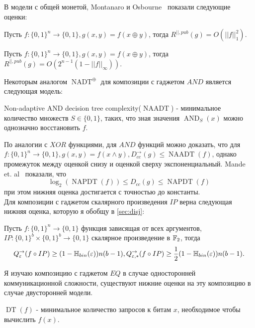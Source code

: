 \documentclass{article}
\begin{document}
В модели с общей монетой, Montanaro и Osbourne~\cite{montanaro} показали следующие оценки:
\begin{theorem}
    Пусть $f: \{0, 1\}^n \to \{0, 1\}, g(x, y) = f(x \oplus y)$, тогда $R^{||, pub}(g) = O(||f||_1^2)$.
\end{theorem}
\begin{theorem}
    Пусть $f: \{0, 1\}^n \to \{0, 1\}, g(x, y) = f(x \oplus y)$, тогда $R^{||, pub}(g) = O(2^{n - 1}(1 - ||f||_{\infty}))$.
\end{theorem}
Некоторым аналогом $\operatorname{NADT}^{\oplus}$ для композиции с гаджетом $AND$ является следующая модель:
\begin{definition}
    Non-adaptive AND decision tree complexity($\operatorname{NAADT}$) -  минимальное количество множеств $S \in \{0, 1\}$, таких, что зная значения $\operatorname{AND}_{S}(x)$ можно однозначно восстановить $f$.  
\end{definition} 
По аналогии с $XOR$ функциями, для $AND$ функций можно доказать, что для $f: \{0, 1\}^{n} \to \{0, 1\}, g(x, y) = f(x \wedge y), D_{cc}^{\to}(g) \leq \operatorname{NAADT}(f)$, однако промежуток между оценкой снизу и оценкой сверху экспоненциальный. Mande et. al~\cite{mande} показали, что   
$$\log_2(\operatorname{NAPDT}(f)) \leq D_{cc}(g) \leq \operatorname{NAPDT}(f)$$ при этом нижняя оценка достигается с точностью до константы.\\
Для композиции с гаджетом скалярного произведения $IP$ верна следующая нижняя оценка, которую я обобщу в \autoref{sec:disj}:
\begin{theorem}
    \label{th:mande}
    Пусть $f: \{0, 1\}^n \to \{0, 1\}$ функция зависящая от всех аргументов, $IP: \{0, 1\}^b \times \{0, 1\}^b \to \{0, 1\}$ скалярное произведение в $\mathbb{F}_2$, тогда $$Q^{\to}_{\varepsilon}(f \circ IP) \geq (1 - \mathbb{H}_{bin}(\varepsilon))n(b - 1), Q^{\to}_{\varepsilon, *}(f \circ IP) \geq \frac{1}{2}(1 - \mathbb{H}_{bin}(\varepsilon))n(b - 1).$$
\end{theorem} 
Я изучаю композицию с гаджетом $EQ$ в случае односторонней коммуникационной сложности, существуют нижние оценки на эту композицию в случае двусторонней модели.
\begin{definition}
    $\operatorname{DT}(f)$ - минимальное количество запросов к битам $x$, необходимое чтобы вычислить $f(x)$.
\end{definition}
\end{document}
